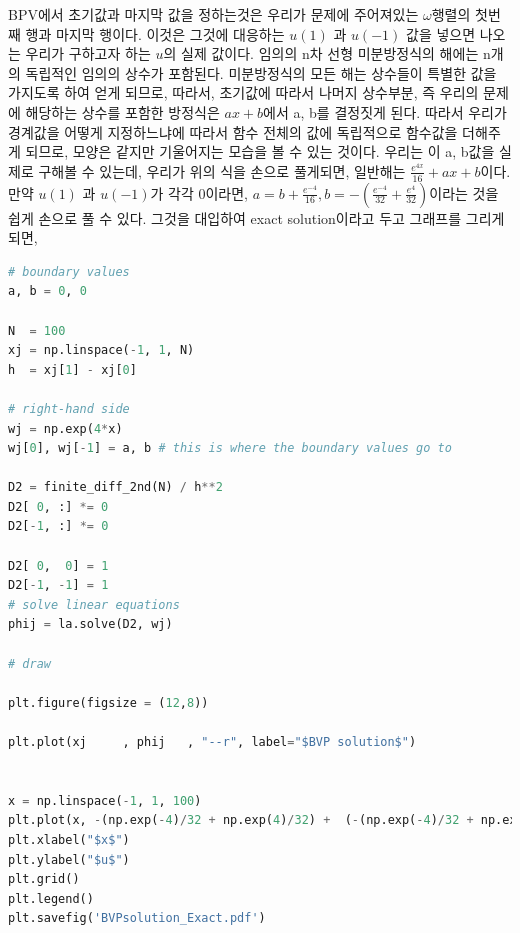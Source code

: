 \documentclass[11pt]{article}
\begin{document}
BPV에서 초기값과 마지막 값을 정하는것은 우리가 문제에 주어져있는 $\omega$행렬의 첫번째 행과 마지막 행이다. 이것은 그것에 대응하는  $u(1)$ 과  $u(-1)$ 값을 넣으면 나오는 우리가 구하고자 하는 $u$의 실제 값이다.  임의의 n차 선형 미분방정식의 해에는 n개의 독립적인 임의의 상수가 포함된다. 미분방정식의 모든 해는 상수들이 특별한 값을 가지도록 하여 얻게 되므로, 따라서, 초기값에 따라서 나머지 상수부분, 즉 우리의 문제에 해당하는 상수를 포함한 방정식은 $ax + b$에서 a, b를 결정짓게 된다. 따라서 우리가 경계값을 어떻게 지정하느냐에 따라서 함수 전체의 값에 독립적으로 함수값을 더해주게 되므로, 모양은 같지만 기울어지는 모습을 볼 수 있는 것이다. 우리는 이 a, b값을 실제로 구해볼 수 있는데,  우리가 위의 식을 손으로 풀게되면, 일반해는 $\frac{e^{4x}}{16} + ax + b$이다. 만약 $u(1)$ 과  $u(-1)$가 각각 0이라면, $a = b + \frac {e^{-4}}{16}, b = -(\frac {e^{-4}}{32} + \frac {e^{4}}{32})$이라는 것을 쉽게 손으로 풀 수 있다. 그것을 대입하여 exact solution이라고 두고 그래프를 그리게 되면,

\begin{lstlisting}[language=Python]
# boundary values
a, b = 0, 0

N  = 100
xj = np.linspace(-1, 1, N)
h  = xj[1] - xj[0]

# right-hand side
wj = np.exp(4*x)
wj[0], wj[-1] = a, b # this is where the boundary values go to

D2 = finite_diff_2nd(N) / h**2
D2[ 0, :] *= 0
D2[-1, :] *= 0

D2[ 0,  0] = 1
D2[-1, -1] = 1
# solve linear equations
phij = la.solve(D2, wj)

# draw

plt.figure(figsize = (12,8))

plt.plot(xj     , phij   , "--r", label="$BVP solution$")


x = np.linspace(-1, 1, 100)
plt.plot(x, -(np.exp(-4)/32 + np.exp(4)/32) +  (-(np.exp(-4)/32 + np.exp(4)/32) + np.exp(-4)/16) * x + np.exp(x * 4) / 16, ':k', label="$Exact solution$")
plt.xlabel("$x$")
plt.ylabel("$u$")
plt.grid()
plt.legend()
plt.savefig('BVPsolution_Exact.pdf')
\end{lstlisting}
\end{document}
